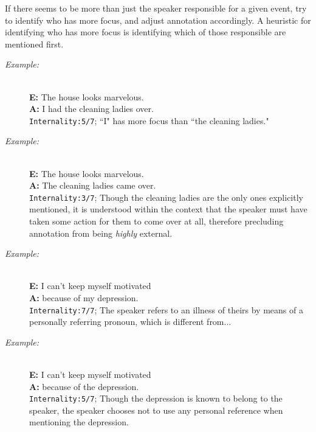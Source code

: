 \documentclass[a4paper,12pt]{article}
\begin{document}
\begin{enumerate}
\begin{description}
            If there seems to be more than just the speaker responsible for a given event, try to identify who has more focus, and adjust annotation accordingly. A heuristic for identifying who has more focus is identifying which of those responsible are mentioned first.
                \begin{description}
                \item[\emph{Example:}]\mbox{}\\
                \textbf{E:} The house looks marvelous.\\ 
                \textbf{A:} I had the cleaning ladies over.\\
                \texttt{Internality:5/7}; ``I" has more focus than ``the cleaning ladies."
                \end{description}
                \begin{description}
                \item[\emph{Example:}]\mbox{}\\
                \textbf{E:} The house looks marvelous.\\ 
                \textbf{A:} The cleaning ladies came over.\\
                \texttt{Internality:3/7}; Though the cleaning ladies are the only ones explicitly mentioned, it is understood within the context that the speaker must have taken some action for them to come over at all, therefore precluding annotation from being \emph{highly} external.  
                \end{description}
                \begin{description}
                \item[\emph{Example:}]\mbox{}\\
                \textbf{E:} I can't keep myself motivated\\ 
                \textbf{A:} because of my depression.\\
                \texttt{Internality:7/7}; The speaker refers to an illness of theirs by means of a personally referring pronoun, which is different from...
                \end{description}
                \begin{description}
                \item[\emph{Example:}]\mbox{}\\
                \textbf{E:} I can't keep myself motivated\\ 
                \textbf{A:} because of the depression.\\
                \texttt{Internality:5/7}; Though the depression is known to belong to the speaker, the speaker chooses not to use any personal reference when mentioning the depression.
                \end{description}
        \end{description}


\end{enumerate}
\end{document}
